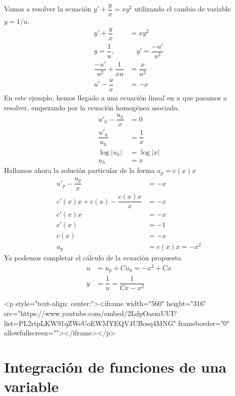 \begin{ejemplo}
Vamos a resolver la ecuación $y'+\dfrac{y}x = xy^2$ utilizando el cambio de variable $y=1/u$.
\begin{align*}
y'+\dfrac{y}x &= xy^2 \\
y=\dfrac1u,&\quad y'=\dfrac{-u'}{u^2} \\
\dfrac{-u'}{u^2}+\dfrac1{xu} &= \dfrac{x}{u^2} \\
u'-\dfrac{u}{x} &= -x
\end{align*}
En este ejemplo, hemos llegado a una ecuación lineal en $u$ que pasamos a resolver, empezando por la ecuación homogénea asociada.
\begin{align*}
u'_h-\dfrac{u_h}{x} &= 0\\
\dfrac{u'_h}{u_h} &= \dfrac1x\\
\log|u_h| &= \log |x| \\
u_h &= x
\end{align*}
Hallamos ahora la solución particular de la forma $u_p=c(x)x$
\begin{align*}
u'_p-\dfrac{u_p}{x} &= -x \\
c'(x)x+c(x)-\dfrac{c(x)x}{x} &= -x \\
c'(x)x &= -x \\
c'(x) &= -1 \\
c(x) &= -x \\
u_p & =c(x)x= -x^2
\end{align*}
Ya podemos completar el cálculo de la ecuación propuesta
\begin{align*}
u & = u_p+Cu_h = -x^2+Cx \\
y &= \dfrac1u = \dfrac1{Cx-x^2}
\end{align*}
\end{ejemplo}

\begin{rawhtml}
<p style="text-align: center;"><iframe width="560" height="316" src="https://www.youtube.com/embed/2LdpOaemUUI?list=PL2rtpLKW91qZWeUoEWMYEQV4UBosq4MNG" frameborder="0" allowfullscreen=""></iframe></p>
\end{rawhtml}

%
%
\newpage

\section{Integración de funciones de una variable}


